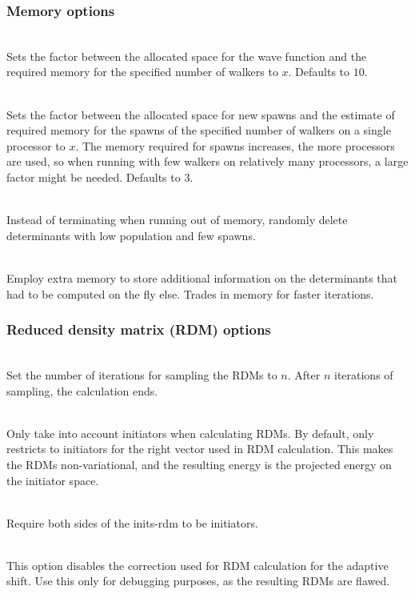 \documentclass[a4paper,notitlepage,dvipsnames]{scrreprt}
\newcommand\codeitem[1]{\needspace{1.5\baselineskip}\item[\textnormal{\ttfamily #1 \nopagebreak}] \hfill \\ \nopagebreak}
\begin{document}
    \subsubsection{Memory options}
  \begin{description}
    \codeitem{memoryFacPart $x$}
    Sets the factor between the allocated space for the wave function and the
    required memory for the specified number of walkers to $x$. Defaults to $10$.
    \codeitem{memoryFacSpawn $x$}
    Sets the factor between the allocated space for new spawns and the estimate of
    required memory for the spawns of the specified number of walkers on a
    single processor to $x$. The memory required for spawns increases, the more
    processors are used, so when running with few walkers on relatively many
    processors, a large factor might be needed. Defaults to $3$.
    \codeitem{prone-walkers}
    Instead of terminating when running out of memory, randomly delete determinants
    with low population and few spawns.
    \codeitem{store-dets}
    Employ extra memory to store additional information on the determinants
    that had to be computed on the fly else. Trades in memory for faster iterations.
  \end{description}

  \subsubsection{Reduced density matrix (RDM) options}
  \begin{description}
    \codeitem{rdmSamplingIters $n$}
    Set the number of iterations for sampling the RDMs to $n$. After $n$
    iterations of sampling, the calculation ends.
    \codeitem{inits-rdm}
    Only take into account initiators when calculating RDMs. By default, only
    restricts to initiators for the right vector used in RDM calculation. This makes the RDMs non-variational, and the resulting energy
    is the projected energy on the initiator space.
    \codeitem{strict-inits-rdm}
    Require both sides of the inits-rdm to be initiators.
    \codeitem{no-lagrangian-rdms}
    This option disables the correction used for RDM calculation for the
    adaptive shift. Use this only for debugging purposes, as the resulting
    RDMs are flawed.
  \end{description}
\end{document}
